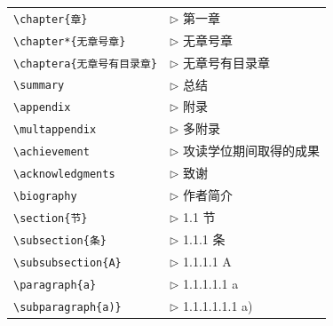 \begin{tabular}{ll}
  \verb|\chapter{章}|              & $\triangleright$ 第一章 \\
  \verb|\chapter*{无章号章}|       & $\triangleright$ 无章号章 \\
  \verb|\chaptera{无章号有目录章}| & $\triangleright$ 无章号有目录章 \\
  \verb|\summary|                  & $\triangleright$ 总结\\
  \verb|\appendix|                 & $\triangleright$ 附录\\
  \verb|\multappendix|             & $\triangleright$ 多附录\\
  \verb|\achievement|              & $\triangleright$ 攻读学位期间取得的成果\\
  \verb|\acknowledgments|          & $\triangleright$ 致谢\\
  \verb|\biography|                & $\triangleright$ 作者简介\\
  \verb|\section{节}|              & $\triangleright$ 1.1 节\\
  \verb|\subsection{条}|           & $\triangleright$ 1.1.1 条\\
  \verb|\subsubsection{A}|         & $\triangleright$ 1.1.1.1 A\\
  \verb|\paragraph{a}|             & $\triangleright$ 1.1.1.1.1 a\\
  \verb|\subparagraph{a)}|         & $\triangleright$ 1.1.1.1.1.1 a)\\
\end{tabular}

